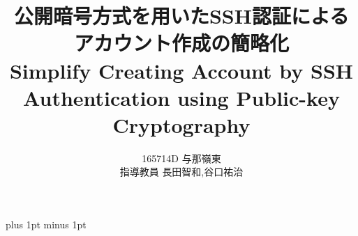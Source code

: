 \documentclass[a4j,12pt]{jreport}
\title{
公開暗号方式を用いたSSH認証による\\
アカウント作成の簡略化\\
Simplify Creating Account by %
SSH Authentication using Public-key Cryptography
}
\author{165714D 与那嶺東  \\ 指導教員 {長田智和,谷口祐治} }
\begin{document}
\maketitle
\baselineskip 17pt plus 1pt minus 1pt

\setcounter{page}{0}

\tableofcontents	%
\listoffigures		%
\listoftables		%










%







%
\end{document}
